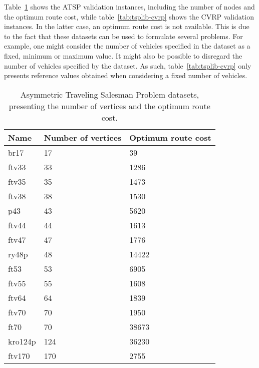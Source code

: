 Table~\ref{tab:tsplib-atsp} shows the ATSP validation instances, including the
number of nodes and the optimum route cost, while table~\ref{tab:tsplib-cvrp}
shows the CVRP validation instances. In the latter case, an optimum route cost
is not available. This is due to the fact that these datasets can be used to
formulate several problems. For example, one might consider the number of
vehicles specified in the dataset as a fixed, minimum or maximum value. It
might also be possible to disregard the number of vehicles specified by the
dataset. As such, table~\ref{tab:tsplib-cvrp} only presents reference values
obtained when considering a fixed number of vehicles.

\begin{table}[H]
  \caption{Asymmetric Traveling Salesman Problem datasets, presenting the
  number of vertices and the optimum route cost.}
  \begin{center}
    \begin{tabular}{lll }
      \hline
      Name & Number of vertices & Optimum route cost \\
      \hline
      br17	  &  17 & 39    \\
      ftv33	  &  33 & 1286  \\
      ftv35	  &  35 & 1473  \\
      ftv38	  &  38 & 1530  \\
      p43	    &  43 & 5620  \\
      ftv44	  &  44 & 1613  \\
      ftv47	  &  47 & 1776  \\
      ry48p	  &  48 & 14422 \\
      ft53	  &  53 & 6905  \\
      ftv55	  &  55 & 1608  \\
      ftv64	  &  64 & 1839  \\
      ftv70	  &  70 & 1950  \\
      ft70	  &  70 & 38673 \\
      kro124p	& 124 & 36230 \\
      ftv170	& 170 & 2755  \\
      \hline
    \end{tabular}
  \end{center}
  \label{tab:tsplib-atsp}
\end{table}
\vfill

